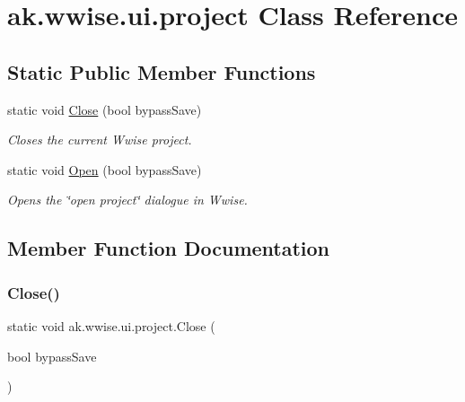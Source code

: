 \hypertarget{classak_1_1wwise_1_1ui_1_1project}{}\section{ak.\+wwise.\+ui.\+project Class Reference}
\label{classak_1_1wwise_1_1ui_1_1project}
\subsection*{Static Public Member Functions}
\begin{DoxyCompactItemize}
\item 
static void \mbox{\hyperlink{classak_1_1wwise_1_1ui_1_1project_aa2dba3629d9a059ac15b63660d823f66}{Close}} (bool bypass\+Save)
\begin{DoxyCompactList}\small\item\em Closes the current Wwise project. \end{DoxyCompactList}\item 
static void \mbox{\hyperlink{classak_1_1wwise_1_1ui_1_1project_a131d440311080d8d181c1b50bb2dabcf}{Open}} (bool bypass\+Save)
\begin{DoxyCompactList}\small\item\em Opens the \char`\"{}open project\char`\"{} dialogue in Wwise. \end{DoxyCompactList}\end{DoxyCompactItemize}


\subsection{Member Function Documentation}
\mbox{\label{classak_1_1wwise_1_1ui_1_1project_aa2dba3629d9a059ac15b63660d823f66}} 
\subsubsection{\texorpdfstring{Close()}{Close()}}
{\footnotesize\ttfamily static void ak.\+wwise.\+ui.\+project.\+Close (\begin{DoxyParamCaption}\item[{bool}]{bypass\+Save }\end{DoxyParamCaption})\hspace{0.3cm}{\ttfamily [static]}}



